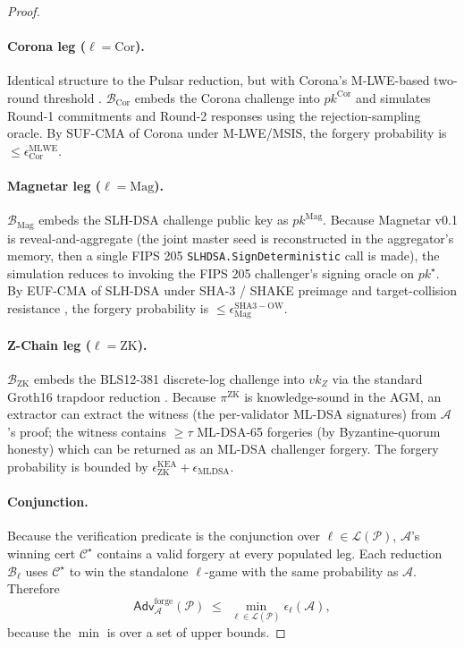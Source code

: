 \begin{proof}
\paragraph{Corona leg ($\ell = \mathrm{Cor}$).} Identical structure to
the Pulsar reduction, but with Corona's M-LWE-based two-round threshold
\cite{ringtail,corona}. $\mathcal{B}_{\mathrm{Cor}}$ embeds
the Corona challenge into $\mathit{pk}^{\mathrm{Cor}}$ and simulates
Round-1 commitments and Round-2 responses using the rejection-sampling
oracle. By SUF-CMA of Corona under M-LWE/MSIS, the forgery probability
is $\leq \epsilon_{\mathrm{Cor}}^{\mathrm{MLWE}}$.

\paragraph{Magnetar leg ($\ell = \mathrm{Mag}$).} $\mathcal{B}_{\mathrm{Mag}}$
embeds the SLH-DSA challenge public key as $\mathit{pk}^{\mathrm{Mag}}$.
Because Magnetar v0.1 is reveal-and-aggregate (the joint master seed
is reconstructed in the aggregator's memory, then a single FIPS 205
\texttt{SLHDSA.SignDeterministic} call is made), the simulation
reduces to invoking the FIPS 205 challenger's signing oracle on
$\mathit{pk}^{\star}$. By EUF-CMA of SLH-DSA under SHA-3 / SHAKE
preimage and target-collision resistance \cite{fips205,sphincs}, the
forgery probability is $\leq \epsilon_{\mathrm{Mag}}^{\mathrm{SHA3-OW}}$.

\paragraph{Z-Chain leg ($\ell = \mathrm{ZK}$).} $\mathcal{B}_{\mathrm{ZK}}$
embeds the BLS12-381 discrete-log challenge into $\mathit{vk}_Z$ via
the standard Groth16 trapdoor reduction \cite{groth2016}. Because
$\pi^{\mathrm{ZK}}$ is knowledge-sound in the AGM, an extractor can
extract the witness (the per-validator ML-DSA signatures) from
$\mathcal{A}$'s proof; the witness contains $\geq \tau$ ML-DSA-65
forgeries (by Byzantine-quorum honesty) which can be returned as an
ML-DSA challenger forgery. The forgery probability is bounded by
$\epsilon_{\mathrm{ZK}}^{\mathrm{KEA}} + \epsilon_{\mathrm{MLDSA}}$.

\paragraph{Conjunction.} Because the verification predicate is the
conjunction over $\ell \in \mathcal{L}(\mathcal{P})$, $\mathcal{A}$'s
winning cert $\mathcal{C}^{\star}$ contains a valid forgery at every
populated leg. Each reduction $\mathcal{B}_\ell$ uses $\mathcal{C}^{\star}$
to win the standalone $\ell$-game with the same probability as
$\mathcal{A}$. Therefore
\[
\mathsf{Adv}^{\mathrm{forge}}_{\mathcal{A}}(\mathcal{P})
\;\leq\;
\min_{\ell \in \mathcal{L}(\mathcal{P})} \epsilon_\ell(\mathcal{A}),
\]
because the $\min$ is over a set of upper bounds.
\end{proof}

